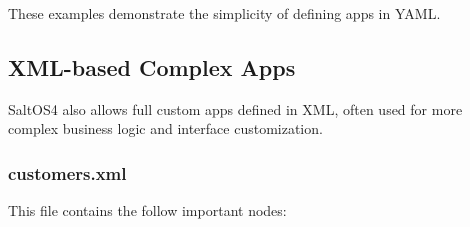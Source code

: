 \documentclass[a4paper]{article}
\begin{document}
These examples demonstrate the simplicity of defining apps in YAML.

\hypertarget{toc36}{}
\subsection{XML-based Complex Apps}

SaltOS4 also allows full custom apps defined in XML, often used for more complex business logic and interface customization.

\hypertarget{toc37}{}
\subsubsection{customers.xml}

This file contains the follow important nodes:
\end{document}
